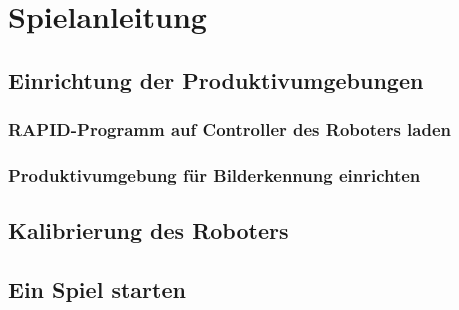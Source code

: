 
\chapter{Spielanleitung}

\section{Einrichtung der Produktivumgebungen}

\subsection{RAPID-Programm auf Controller des Roboters laden}

\subsection{Produktivumgebung für Bilderkennung einrichten}

\section{Kalibrierung des Roboters}

\section{Ein Spiel starten}